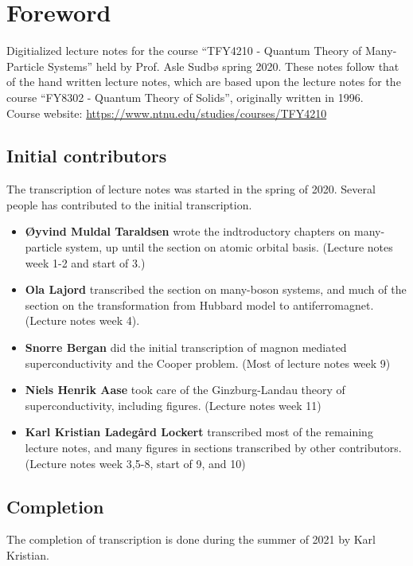 \section*{Foreword}

Digitialized lecture notes for the course ``TFY4210 - Quantum Theory of Many-Particle Systems'' held by Prof. Asle Sudbø spring 2020. These notes follow that of the hand written lecture notes, which are based upon the lecture notes for the course ``FY8302 - Quantum Theory of Solids'', originally written in 1996. \\
Course website: \href{https://www.ntnu.edu/studies/courses/TFY4210}{https://www.ntnu.edu/studies/courses/TFY4210}



\subsection*{Initial contributors}

The transcription of lecture notes was started in the spring of 2020. Several people has contributed to the initial transcription. 
\begin{itemize} 
	\item \textbf{Øyvind Muldal Taraldsen} wrote the indtroductory chapters on many-particle system, up until the section on atomic orbital basis. (Lecture notes week 1-2 and start of 3.)
	\item \textbf{Ola Lajord} transcribed the section on many-boson systems, and much of the section on the transformation from Hubbard model to antiferromagnet. (Lecture notes week 4).
	\item \textbf{Snorre Bergan} did the initial transcription of magnon mediated superconductivity and the Cooper problem. (Most of lecture notes week 9)
	\item \textbf{Niels Henrik Aase} took care of the Ginzburg-Landau theory of superconductivity, including figures. (Lecture notes week 11)
	\item \textbf{Karl Kristian Ladegård Lockert} transcribed most of the remaining lecture notes, and many figures in sections transcribed by other contributors. (Lecture notes week 3,5-8, start of 9, and 10)
\end{itemize}

\subsection*{Completion}
The completion of transcription is done during the summer of 2021 by Karl Kristian.

